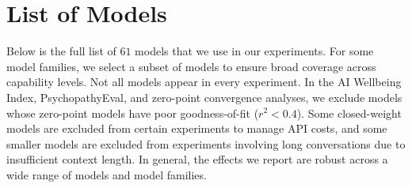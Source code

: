
\newpage
\section{List of Models}
\label{app:model-list}

Below is the full list of $61$ models that we use in our experiments. For some model families, we select a subset of models to ensure broad coverage across capability levels. Not all models appear in every experiment. In the AI Wellbeing Index, PsychopathyEval, and zero-point convergence analyses, we exclude models whose zero-point models have poor goodness-of-fit ($r^2 < 0.4$). Some closed-weight models are excluded from certain experiments to manage API costs, and some smaller models are excluded from experiments involving long conversations due to insufficient context length. In general, the effects we report are robust across a wide range of models and model families.


